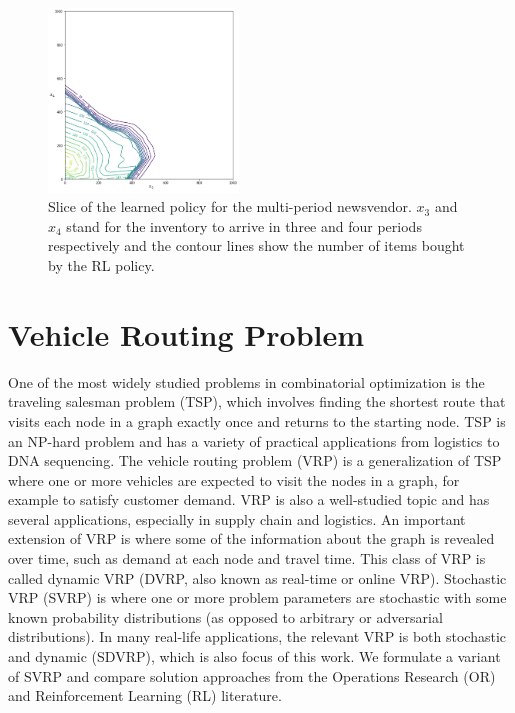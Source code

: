 \documentclass[letterpaper]{article} %
\begin{document}
\begin{figure}[htbp]
	\centering
	\includegraphics[width=0.45\textwidth]{images/newsvendor_trpo_policy.png}
	\caption{Slice of the learned policy for the multi-period newsvendor. $x_3$ and $x_4$ stand for the inventory to arrive in three and four periods respectively and the contour lines show the number of items bought by the RL policy.}
	\label{fig:newsvendor_policy}
\end{figure}


\section{Vehicle Routing Problem}
\label{sec_vrp_intro}

One of the most widely studied problems in combinatorial optimization is the traveling salesman problem (TSP), which involves finding the shortest route that visits each node in a graph exactly once and returns to the starting node. TSP is an NP-hard problem and has a variety of practical applications from logistics to DNA sequencing. The vehicle routing problem (VRP) is a generalization of TSP where one or more vehicles are expected to visit the nodes in a graph, for example to satisfy customer demand. VRP is also a well-studied topic and has several applications, especially in supply chain and logistics. %
An important extension of VRP is where some of the information about the graph is revealed over time, such as demand at each node and travel time. This class of VRP is called dynamic VRP (DVRP, also known as real-time or online VRP). Stochastic VRP (SVRP) is where one or more problem parameters are stochastic with some known probability distributions (as opposed to arbitrary or adversarial distributions). In many real-life applications, the relevant VRP is both stochastic and dynamic (SDVRP), which is also focus of this work. We formulate a variant of SVRP and compare solution approaches from the Operations Research (OR) and Reinforcement Learning (RL) literature.
\end{document}
